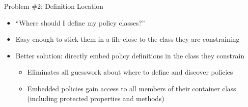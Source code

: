 \documentclass[aspectratio=169]{beamer}
\begin{document}
\begin{frame}
\end{frame}

\begin{frame}{Problem \#2: Definition Location}
  \begin{itemize}
    \item ``Where should I define my policy classes?''
    \vspace{8pt}
    \item Easy enough to stick them in a file close to the class they are constraining
    \vspace{8pt}
    \item Better solution: directly embed policy definitions in the class they constrain
    \begin{itemize}
      \vspace{8pt}
      \item Eliminates all guesswork about where to define and discover policies
      \vspace{8pt}
      \item Embedded policies gain access to all members of their container class (including protected properties and methods)
    \end{itemize}
  \end{itemize}
\end{frame}
\end{document}
